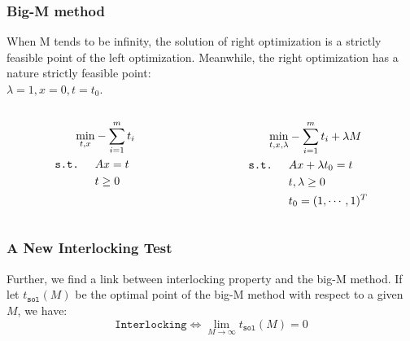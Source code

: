 \documentclass{beamer}
\begin{document}
\begin{frame}
\frametitle{Big-M method}
When M tends to be infinity, the solution of right optimization is a strictly feasible point of the left optimization. Meanwhile, the right optimization has a nature strictly feasible point:\\ \centering $\lambda = 1, x = 0, t = t_0$.
\begin{columns}
	\begin{column}{0.5\textwidth}
		\begin{equation*}
		\begin{aligned}
		\min_{t, x}& -\sum_{i=1}^{m} t_i \\
		\texttt{s.t.} \hspace{0.5cm} & Ax = t \\
		& t \geq 0
		\end{aligned}
		\end{equation*}
	\end{column}
	\begin{column}{0.5\textwidth}
		\begin{equation*}
		\begin{aligned}
		\min_{t, x,\lambda}& -\sum_{i=1}^{m} t_i + \lambda M \\
		\texttt{s.t.} \hspace{0.5cm} & Ax + \lambda t_0 = t \\
		& t, \lambda  \geq 0 \\
		& t_0 = (1, \cdots, 1)^T
		\end{aligned}
		\label{eq:lp}
		\end{equation*}
\end{column}
\end{columns}
\end{frame}

\begin{frame}
\frametitle{A New Interlocking Test}
Further, we find a link between interlocking property and the big-M method. If let $t_{\texttt{sol}}(M)$ be the optimal point of the big-M method with respect to a given $M$, we have:
\begin{equation*}
\texttt{Interlocking} \iff \lim_{M\to\infty}t_{\texttt{sol}}(M) = 0
\end{equation*}
\end{frame}
\end{document}
